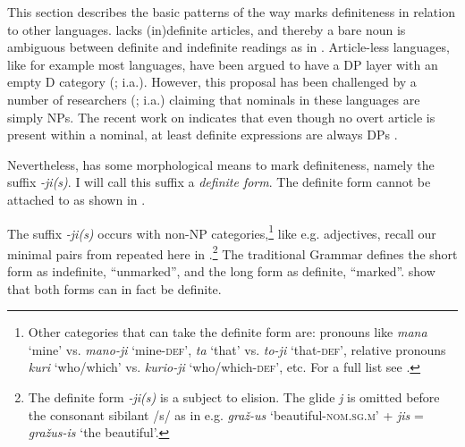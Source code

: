 \documentclass[output=paper,
modfonts
]{langscibook}
\begin{document}
This section describes the basic patterns of the way  marks definiteness in relation to other languages. 
 lacks (in)definite articles, and thereby a bare noun is ambiguous between definite and indefinite readings as in . Article-less languages, like for example most  languages, have been argued to have a DP layer with an empty D category (\citealt{Rappaport1998,Leko1999,Pereltsvaig2007}; i.a.). However, this proposal has been challenged by a number of researchers (\citealt{Boskovic2009,Boskovic2012,BoskovicGajewski2011,Despic2011}; i.a.) claiming that nominals in these languages are simply NPs. The recent work on  indicates that even though no overt article is present within a \largerpage nominal, at least definite expressions are always DPs \citep{GillonArmoskaite2015}. \newpage

\begin{exe}
\end{exe}

Nevertheless,  has some morphological means to mark definiteness, namely the suffix \textit{-ji(s)}. I will call this suffix a \textit{definite form}. The definite form cannot be attached to  as shown in . 

\begin{exe}
\end{exe}

The suffix \textit{-ji(s)} occurs with non-NP categories,\footnote{Other categories that can take the definite form are: pronouns like \textit{mana} `mine' vs. \textit{mano-ji} `mine-\textsc{def}', 
 \textit{ta}  `that' vs. \textit{to-ji} `that-\textsc{def}', relative pronouns \textit{kuri} `who/which' vs. \textit{kurio-ji} `who/which-\textsc{def}', etc. For a full list see \citet[223--224]{Stolz2008}.} like e.g. adjectives, recall our minimal pairs from  repeated here in .\footnote{The definite form \textit{-ji(s)} is a subject to elision. The glide \textit{j} is omitted before the consonant sibilant /s/ as in e.g. \textit{graž-us} `beautiful-\textsc{nom.sg.m}' + \textit{jis} = \textit{gražus-is} `the beautiful'.} The traditional  Grammar \citep[142]{Ambrazas1997} defines the short form as indefinite, ``unmarked'', and the long form as definite, ``marked''. \citet{GillonArmoskaite2015} show that both forms can in fact be definite.
\end{document}
